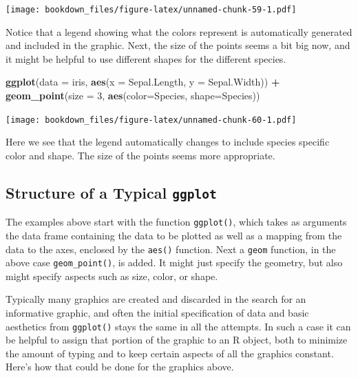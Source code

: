 \documentclass[]{krantz}
\makeatletter
\newenvironment{Shaded}{\begin{snugshade}}{\end{snugshade}}
\newcommand{\KeywordTok}[1]{\textcolor[rgb]{0.27,0.27,0.27}{\textbf{#1}}}
\newcommand{\DataTypeTok}[1]{\textcolor[rgb]{0.27,0.27,0.27}{#1}}
\newcommand{\DecValTok}[1]{\textcolor[rgb]{0.06,0.06,0.06}{#1}}
\newcommand{\StringTok}[1]{\textcolor[rgb]{0.5,0.5,0.5}{#1}}
\newcommand{\OperatorTok}[1]{\textcolor[rgb]{0.43,0.43,0.43}{\textbf{#1}}}
\newcommand{\NormalTok}[1]{#1}
\newenvironment{kframe}{%
\medskip{}
\setlength{\fboxsep}{.8em}
 \def\at@end@of@kframe{}%
 \ifinner\ifhmode%
  \def\at@end@of@kframe{\end{minipage}}%
  \begin{minipage}{\columnwidth}%
 \fi\fi%
 \def\FrameCommand##1{\hskip\@totalleftmargin \hskip-\fboxsep
 \colorbox{shadecolor}{##1}\hskip-\fboxsep
     \hskip-\linewidth \hskip-\@totalleftmargin \hskip\columnwidth}%
 \MakeFramed {\advance\hsize-\width
   \@totalleftmargin\z@ \linewidth\hsize
   \@setminipage}}%
 {\par\unskip\endMakeFramed%
 \at@end@of@kframe}
\renewenvironment{Shaded}{\begin{kframe}}{\end{kframe}}
\makeatother
\begin{document}
\texttt{[image: bookdown\_files/figure-latex/unnamed-chunk-59-1.pdf]}

Notice that a legend showing what the colors represent is automatically
generated and included in the graphic. Next, the size of the points
seems a bit big now, and it might be helpful to use different shapes for
the different species.

\begin{Shaded}
\begin{Highlighting}[]
\KeywordTok{ggplot}\NormalTok{(}\DataTypeTok{data =}\NormalTok{ iris, }\KeywordTok{aes}\NormalTok{(}\DataTypeTok{x =}\NormalTok{ Sepal.Length, }\DataTypeTok{y =}\NormalTok{ Sepal.Width)) }\OperatorTok{+}\StringTok{ }
\StringTok{    }\KeywordTok{geom_point}\NormalTok{(}\DataTypeTok{size =} \DecValTok{3}\NormalTok{, }\KeywordTok{aes}\NormalTok{(}\DataTypeTok{color=}\NormalTok{Species, }\DataTypeTok{shape=}\NormalTok{Species))}
\end{Highlighting}
\end{Shaded}

\texttt{[image: bookdown\_files/figure-latex/unnamed-chunk-60-1.pdf]}

Here we see that the legend automatically changes to include species
specific color and shape. The size of the points seems more appropriate.

\subsection{\texorpdfstring{Structure of a Typical
\texttt{ggplot}}{Structure of a Typical ggplot}}\label{structure-of-a-typical-ggplot}

The examples above start with the function \texttt{ggplot()}, which
takes as arguments the data frame containing the data to be plotted as
well as a mapping from the data to the axes, enclosed by the
\texttt{aes()} function. Next a \texttt{geom} function, in the above
case \texttt{geom\_point()}, is added. It might just specify the
geometry, but also might specify aspects such as size, color, or shape.

Typically many graphics are created and discarded in the search for an
informative graphic, and often the initial specification of data and
basic aesthetics from \texttt{ggplot()} stays the same in all the
attempts. In such a case it can be helpful to assign that portion of the
graphic to an R object, both to minimize the amount of typing and to
keep certain aspects of all the graphics constant. Here's how that could
be done for the graphics above.
\end{document}
